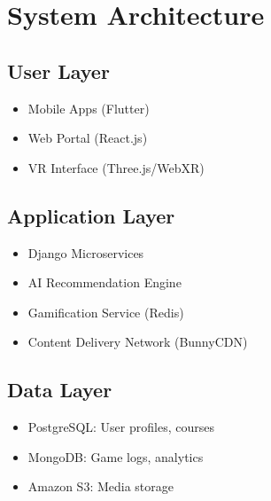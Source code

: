\documentclass[12pt,a4paper]{article}
\begin{document}
\section{System Architecture}
\subsection{User Layer}
\begin{itemize}[leftmargin=*]
  \item Mobile Apps (Flutter)
  \item Web Portal (React.js)
  \item VR Interface (Three.js/WebXR)
\end{itemize}

\subsection{Application Layer}
\begin{itemize}[leftmargin=*]
  \item Django Microservices
  \item AI Recommendation Engine
  \item Gamification Service (Redis)
  \item Content Delivery Network (BunnyCDN)
\end{itemize}

\subsection{Data Layer}
\begin{itemize}[leftmargin=*]
  \item PostgreSQL: User profiles, courses
  \item MongoDB: Game logs, analytics
  \item Amazon S3: Media storage
\end{itemize}
\end{document}
